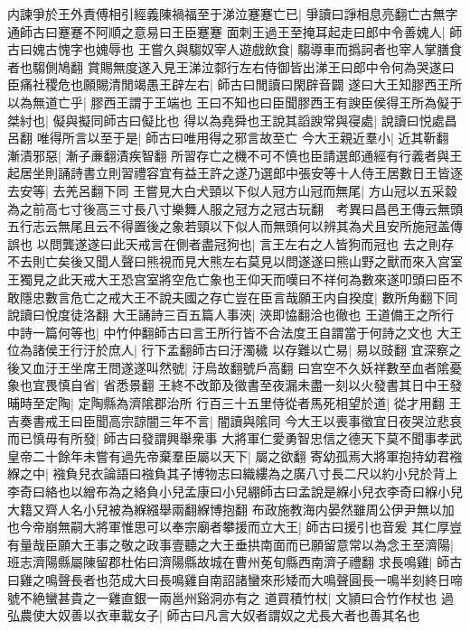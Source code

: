 内諫爭於王外責傅相引經義陳禍福至于涕泣蹇蹇亡已|{
	爭讀曰諍相息亮翻亡古無字通師古曰蹇蹇不阿順之意易曰王臣蹇蹇}
面刺王過王至掩耳起走曰郎中令善媿人|{
	師古曰媿古愧字也媿辱也}
王嘗久與騶奴宰人遊戲飲食|{
	騶導車而撝訶者也宰人掌膳食者也騶側鳩翻}
賞賜無度遂入見王涕泣䣛行左右侍御皆出涕王曰郎中令何為哭遂曰臣痛社稷危也願賜清閒竭愚王辟左右|{
	師古曰閒讀曰閑辟音闢}
遂曰大王知膠西王所以為無道亡乎|{
	膠西王謂于王端也}
王曰不知也曰臣聞膠西王有諛臣侯得王所為儗于桀紂也|{
	儗與擬同師古曰儗比也}
得以為堯舜也王說其謟諛常與寑處|{
	說讀曰悦處昌呂翻}
唯得所言以至于是|{
	師古曰唯用得之邪言故至亡}
今大王親近羣小|{
	近其靳翻}
漸漬邪惡|{
	漸子亷翻漬疾智翻}
所習存亡之機不可不慎也臣請選郎通經有行義者與王起居坐則誦詩書立則習禮容宜有益王許之遂乃選郎中張安等十人侍王居數日王皆逐去安等|{
	去羌呂翻下同}
王嘗見大白犬頸以下似人冠方山冠而無尾|{
	方山冠以五采縠為之前高七寸後高三寸長八寸樂舞人服之冠方之冠古玩翻　考異曰昌邑王傳云無頭五行志云無尾且云不得置後之象若頸以下似人而無頭何以辨其為犬且安所施冠盖傳誤也}
以問龔遂遂曰此天戒言在側者盡冠狗也|{
	言王左右之人皆狗而冠也}
去之則存不去則亡矣後又聞人聲曰熊視而見大熊左右莫見以問遂遂曰熊山野之獸而來入宫室王獨見之此天戒大王恐宫室將空危亡象也王仰天而嘆曰不祥何為數來遂叩頭曰臣不敢隱忠數言危亡之戒大王不說夫國之存亡豈在臣言哉願王内自揆度|{
	數所角翻下同說讀曰悅度徒洛翻}
大王誦詩三百五篇人事浹|{
	浹即恊翻洽也徹也}
王道備王之所行中詩一篇何等也|{
	中竹仲翻師古曰言王所行皆不合法度王自謂當于何詩之文也}
大王位為諸侯王行汙於庶人|{
	行下孟翻師古曰汙濁穢}
以存難以亡易|{
	易以豉翻}
宜深察之後又血汙王坐席王問遂遂叫然號|{
	汙烏故翻號戶高翻}
曰宫空不久妖祥數至血者隂憂象也宜畏慎自省|{
	省悉景翻}
王終不改節及徵書至夜漏未盡一刻以火發書其日中王發晡時至定陶|{
	定陶縣為濟隂郡治所}
行百三十五里侍從者馬死相望於道|{
	從才用翻}
王吉奏書戒王曰臣聞高宗諒闇三年不言|{
	闇讀與隂同}
今大王以喪事徵宜日夜哭泣悲哀而已慎毋有所發|{
	師古曰發謂興舉衆事}
大將軍仁愛勇智忠信之德天下莫不聞事孝武皇帝二十餘年未嘗有過先帝棄羣臣屬以天下|{
	屬之欲翻}
寄幼孤焉大將軍抱持幼君襁緥之中|{
	襁負兒衣論語曰襁負其子博物志曰織縷為之廣八寸長二尺以約小兒於背上李奇曰絡也以繒布為之絡負小兒孟康曰小兒綳師古曰孟說是緥小兒衣李奇曰緥小兒大籍又齊人名小兒被為緥繦舉兩翻緥博抱翻}
布政施教海内晏然雖周公伊尹無以加也今帝崩無嗣大將軍惟思可以奉宗廟者攀援而立大王|{
	師古曰援引也音爰}
其仁厚豈有量哉臣願大王事之敬之政事壹聽之大王垂拱南面而已願留意常以為念王至濟陽|{
	班志濟陽縣屬陳留郡杜佑曰濟陽縣故城在曹州莬旬縣西南濟子禮翻}
求長鳴雞|{
	師古曰雞之鳴聲長者也范成大曰長鳴雞自南詔諸蠻來形矮而大鳴聲圓長一鳴半刻終日啼號不絶蠻甚貴之一雞直銀一兩邕州谿洞亦有之}
道買積竹杖|{
	文頴曰合竹作杖也}
過弘農使大奴善以衣車載女子|{
	師古曰凡言大奴者謂奴之尤長大者也善其名也}
